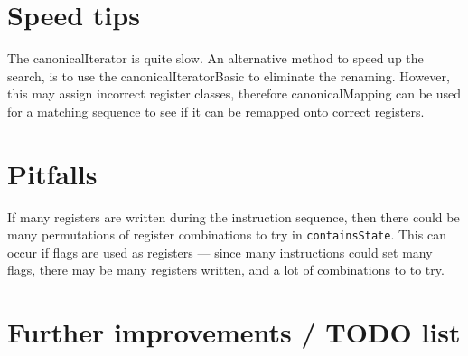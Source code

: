 \documentclass{article}
\begin{document}
\section{Speed tips}

The canonicalIterator is quite slow. An alternative method to speed up the search, is to use the canonicalIteratorBasic to eliminate the renaming. However, this may assign incorrect register classes, therefore canonicalMapping can be used for a matching sequence to see if it can be remapped onto correct registers.

\section{Pitfalls}

If many registers are written during the instruction sequence, then there could be many permutations of register combinations to try in \texttt{containsState}. This can occur if flags are used as registers --- since many instructions could set many flags, there may be many registers written, and a lot of combinations to to try.


\section{Further improvements / TODO list}
\end{document}
